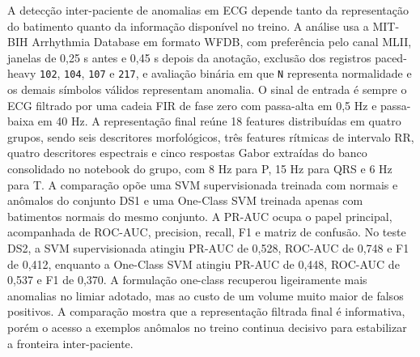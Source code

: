 A detecção inter-paciente de anomalias em ECG depende tanto da representação do
batimento quanto da informação disponível no treino. A análise usa a MIT-BIH
Arrhythmia Database em formato WFDB, com preferência pelo canal MLII, janelas
de 0,25 s antes e 0,45 s depois da anotação, exclusão dos registros
paced-heavy \texttt{102}, \texttt{104}, \texttt{107} e \texttt{217}, e
avaliação binária em que \texttt{N} representa normalidade e os demais símbolos
válidos representam anomalia. O sinal de entrada é sempre o ECG filtrado por
uma cadeia FIR de fase zero com passa-alta em 0,5 Hz e passa-baixa em 40 Hz.
A representação final reúne 18 features distribuídas em quatro grupos, sendo
seis descritores morfológicos, três features rítmicas de intervalo RR, quatro
descritores espectrais e cinco respostas Gabor extraídas do banco consolidado
no notebook do grupo, com 8 Hz para P, 15 Hz para QRS e 6 Hz para T. A
comparação opõe uma SVM supervisionada treinada com normais e anômalos do
conjunto DS1 e uma One-Class SVM treinada apenas com batimentos normais do
mesmo conjunto. A PR-AUC ocupa o papel principal, acompanhada de ROC-AUC,
precision, recall, F1 e matriz de confusão. No teste DS2, a SVM supervisionada
atingiu PR-AUC de 0,528, ROC-AUC de 0,748 e F1 de 0,412, enquanto a One-Class
SVM atingiu PR-AUC de 0,448, ROC-AUC de 0,537 e F1 de 0,370. A formulação
one-class recuperou ligeiramente mais anomalias no limiar adotado, mas ao custo
de um volume muito maior de falsos positivos. A comparação mostra que a
representação filtrada final é informativa, porém o acesso a exemplos anômalos
no treino continua decisivo para estabilizar a fronteira inter-paciente.
